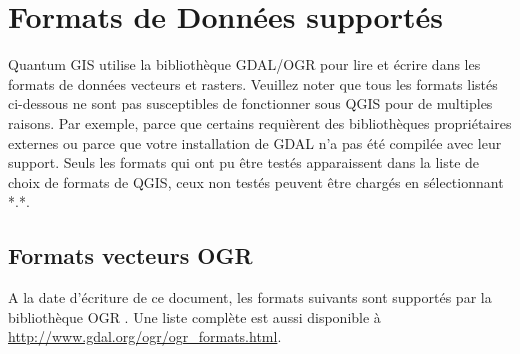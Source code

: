 \chapter{Formats de Données supportés}\label{appdx_data_formats}


Quantum GIS utilise la bibliothèque GDAL/OGR pour lire et écrire dans les formats de données vecteurs et rasters. Veuillez noter que tous les formats listés ci-dessous ne sont pas susceptibles de fonctionner sous QGIS pour de multiples raisons. Par exemple, parce que certains requièrent des bibliothèques propriétaires externes ou parce que votre installation de GDAL n'a pas été compilée avec leur support. Seuls les formats qui ont pu être testés apparaissent dans la liste de choix de formats de QGIS, ceux non testés peuvent être chargés en sélectionnant *.*.

\section{Formats vecteurs OGR}\label{appdx_ogr}

A la date d'écriture de ce document, les formats suivants sont supportés par la bibliothèque OGR \cite{OGRweb}. Une liste complète est aussi disponible à \url{http://www.gdal.org/ogr/ogr_formats.html}.

